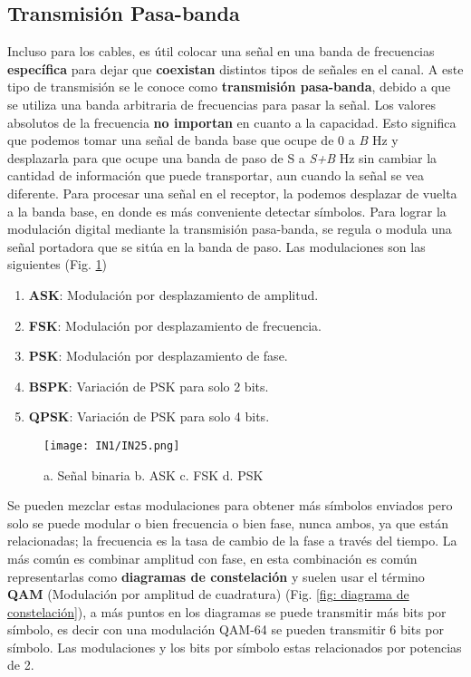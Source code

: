 \documentclass[
	12pt, %
	fleqn, %
	a4paper, %
	oneside, %
]{LegrandOrangeBook}
\begin{document}
\subsection{Transmisión Pasa-banda}
Incluso para los cables, es útil colocar una señal en una banda de frecuencias \textbf{específica} para dejar que \textbf{coexistan} distintos tipos de señales en el canal. A este tipo de transmisión se le conoce como \textbf{transmisión pasa-banda}, debido a que se utiliza una banda arbitraria de frecuencias para pasar la señal. Los valores absolutos de la frecuencia \textbf{no importan} en cuanto a la capacidad. Esto significa que podemos tomar una señal de banda base que ocupe de 0 a \textit{B} Hz y desplazarla para que ocupe una banda de paso de S a \textit{S+B} Hz sin cambiar la cantidad de información que puede transportar, aun cuando la señal se vea diferente. Para procesar una señal en el receptor, la podemos desplazar de vuelta a la banda base, en donde es más conveniente detectar símbolos. Para lograr la modulación digital mediante la transmisión pasa-banda, se regula o modula una señal portadora que se sitúa en la banda de paso.	Las modulaciones son las siguientes (Fig. \ref{fig: modulacion ancho B})
\begin{enumerate}
\item \textbf{ASK}: Modulación por desplazamiento de amplitud.
\item \textbf{FSK}: Modulación por desplazamiento de frecuencia.
\item \textbf{PSK}: Modulación por desplazamiento de fase.
\item \textbf{BSPK}: Variación de PSK para solo 2 bits.
\item \textbf{QPSK}: Variación de PSK para solo 4 bits.
\end{enumerate}
\begin{figure}[H]
\centering
\texttt{[image: IN1/IN25.png]}
\caption{a. Señal binaria b. ASK c. FSK d. PSK}
\label{fig: modulacion ancho B}
\end{figure}
Se pueden mezclar estas modulaciones para obtener más símbolos enviados pero solo se puede modular o bien frecuencia o bien fase, nunca ambos, ya que están relacionadas; la frecuencia es la tasa de cambio de la fase a través del tiempo. La más común es combinar amplitud con fase, en esta combinación es común representarlas como \textbf{diagramas de constelación} y suelen usar el término \textbf{QAM} (Modulación por amplitud de cuadratura) (Fig. \ref{fig: diagrama de constelación}), a más puntos en los diagramas se puede transmitir más bits por símbolo, es decir con una modulación QAM-64 se pueden transmitir 6 bits por símbolo. Las modulaciones y los bits por símbolo estas relacionados por potencias de 2.\\
\end{document}
